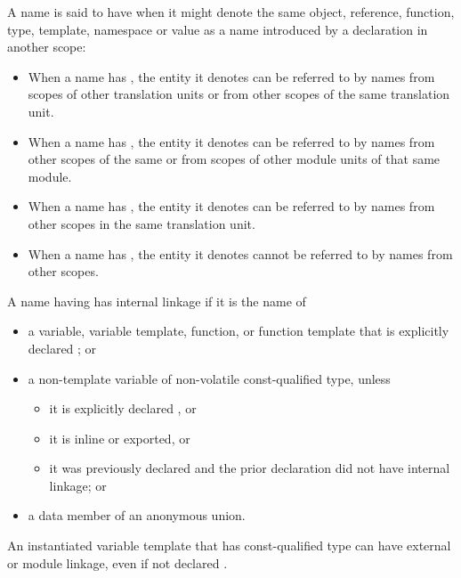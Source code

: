 \pnum
{}%
%
%
%
A name is said to have  when it might denote the same
object, reference, function, type, template, namespace or value as a
name introduced by a declaration in another scope:
\begin{itemize}
\item When a name has ,
the entity it denotes
can be referred to by names from scopes of other translation units or
from other scopes of the same translation unit.

\item When a name has ,
the entity it denotes
can be referred to by names from other scopes of the same  or
from scopes of other module units of that same module.

\item When a name has ,
the entity it denotes
can be referred to by names from other scopes in the same translation
unit.

\item When a name has , the entity it denotes
cannot be referred to by names from other scopes.
\end{itemize}

\pnum
{}%
%
%
%
%
%
A name having  has internal
linkage if it is the name of
\begin{itemize}
\item
  a variable, variable template, function, or function template that is
  explicitly declared ; or
\item
  a non-template variable of non-volatile const-qualified type, unless
  \begin{itemize}
  \item it is explicitly declared , or
  \item it is inline or exported, or
  \item it was previously declared and the prior declaration did
  not have internal linkage; or
  \end{itemize}
\item
  a data member of an anonymous union.
\end{itemize}
\begin{note}
An instantiated variable template that has const-qualified type
can have external or module linkage, even if not declared .
\end{note}

